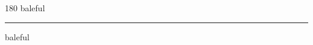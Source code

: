 
\begin{frame}
\begin{center}
\begin{turn}{180}
{\fontsize{2.5cm}{1em}\selectfont baleful}
\end{turn}
\vspace{1em}\par  
\hrule
\vspace{1em}\par  
{\fontsize{2.5cm}{1em}\selectfont baleful}
\end{center}
\end{frame}
